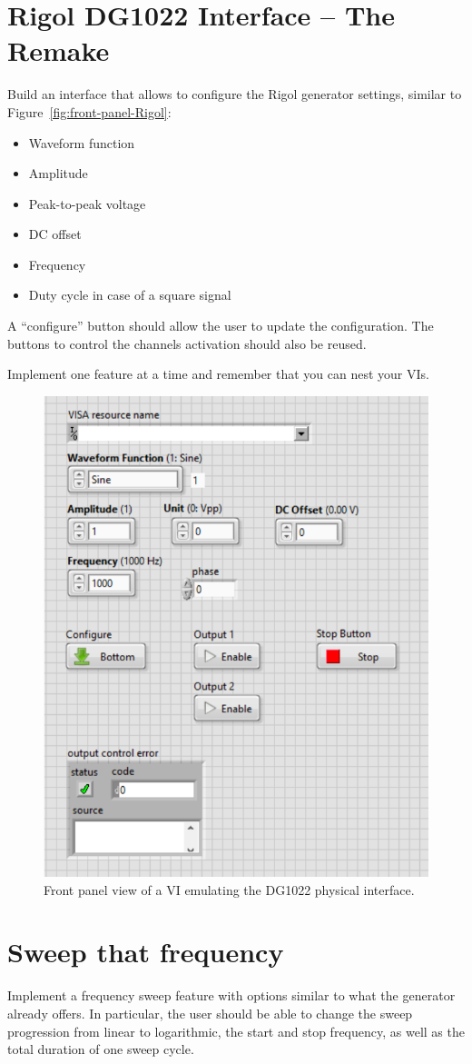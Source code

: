 \documentclass{labo}
\begin{document}
\section{Rigol DG1022 Interface -- The Remake}
Build an interface that allows to configure the Rigol generator settings, similar to Figure~\vref{fig:front-panel-Rigol}:
\begin{itemize}
  \item Waveform function
  \item Amplitude
  \item Peak-to-peak voltage
  \item DC offset
  \item Frequency
  \item Duty cycle in case of a square signal
\end{itemize}
A ``configure'' button should allow the user to update the configuration.
The buttons to control the channels activation should also be reused.

Implement one feature at a time and remember that you can nest your VIs.

\begin{figure}[ht!]
\centering
\includegraphics[width=.5\linewidth]{front-panel-Rigol.png}
\caption{Front panel view of a VI emulating the DG1022 physical interface.}
\label{fig:front-panel-Rigol}
\end{figure}


\section{Sweep that frequency}
Implement a frequency sweep feature with options similar to what the generator already offers.
In particular, the user should be able to change the sweep progression from linear to logarithmic, the start and stop frequency, as well as the total duration of one sweep cycle.
\end{document}
